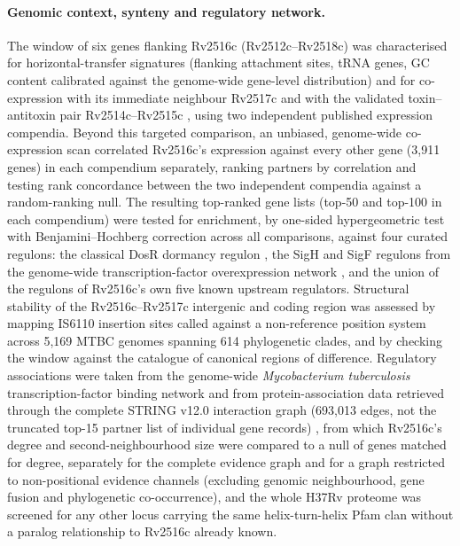 \documentclass[11pt,a4paper]{article}
\newcommand{\mtb}{\textit{Mycobacterium tuberculosis}}
\begin{document}
\paragraph{Genomic context, synteny and regulatory network.} The window of six genes flanking
Rv2516c (Rv2512c--Rv2518c) was characterised for horizontal-transfer signatures (flanking
attachment sites, tRNA genes, GC content calibrated against the genome-wide gene-level
distribution) and for co-expression with its immediate neighbour Rv2517c and with the validated
toxin--antitoxin pair Rv2514c--Rv2515c \citep{tandon2019ta}, using two independent published
expression compendia. Beyond this targeted comparison, an unbiased, genome-wide co-expression scan
correlated Rv2516c's expression against every other gene (3{,}911 genes) in each compendium
separately, ranking partners by correlation and testing rank concordance between the two
independent compendia against a random-ranking null. The resulting top-ranked gene lists (top-50
and top-100 in each compendium) were tested for enrichment, by one-sided hypergeometric test with
Benjamini--Hochberg correction across all comparisons, against four curated regulons: the classical
DosR dormancy regulon \citep{rustad2008dosr}, the SigH and SigF regulons from the genome-wide
transcription-factor overexpression network \citep{minch2015network,rustad2014tfoe}, and the union
of the regulons of Rv2516c's own five known upstream regulators. Structural stability of the
Rv2516c--Rv2517c intergenic and coding region was assessed by mapping IS6110 insertion sites called
against a non-reference position system across 5{,}169 MTBC genomes spanning 614 phylogenetic
clades, and by checking the window against the catalogue of canonical regions of difference.
Regulatory associations were taken from the genome-wide \mtb{}
transcription-factor binding network \citep{minch2015network} and from protein-association data
retrieved through the complete STRING v12.0 interaction graph (693{,}013 edges, not the truncated
top-15 partner list of individual gene records) \citep{szklarczyk2023string}, from which
Rv2516c's degree and second-neighbourhood size were compared to a null of genes matched for degree,
separately for the complete evidence graph and for a graph restricted to non-positional evidence
channels (excluding genomic neighbourhood, gene fusion and phylogenetic co-occurrence), and the
whole H37Rv proteome was screened for any other locus carrying the same helix-turn-helix Pfam
clan without a paralog relationship to Rv2516c already known.
\end{document}
